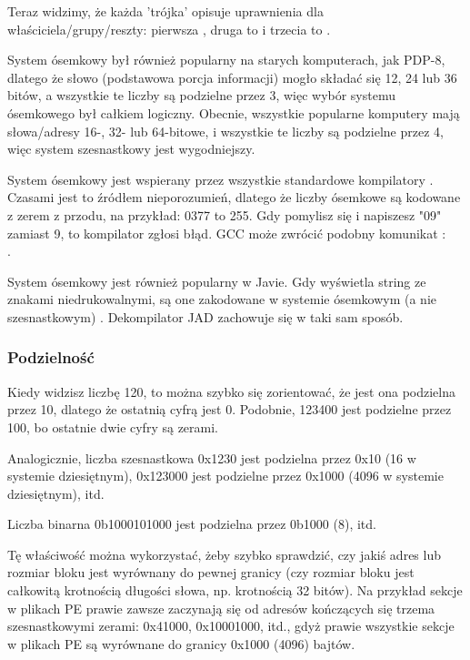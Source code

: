 Teraz widzimy, że każda 'trójka' opisuje uprawnienia dla właściciela/grupy/reszty: pierwsza , druga to  i trzecia to .

System ósemkowy był również popularny na starych komputerach, jak PDP-8, dlatego że słowo (podstawowa porcja informacji) mogło składać się 12, 24 lub
36 bitów, a wszystkie te liczby są podzielne przez 3, więc wybór systemu ósemkowego był całkiem logiczny.
Obecnie, wszystkie popularne komputery mają słowa/adresy 16-, 32- lub 64-bitowe, i wszystkie te liczby są podzielne przez 4,
więc system szesnastkowy jest wygodniejszy.

System ósemkowy jest wspierany przez wszystkie standardowe kompilatory \CCpp{}.
Czasami jest to źródłem nieporozumień, dlatego że liczby ósemkowe są kodowane z zerem z przodu, na przykład: 0377 to 255.
Gdy pomylisz się i napiszesz "09" zamiast 9, to kompilator zgłosi błąd.
GCC może zwrócić podobny komunikat :\\
.

System ósemkowy jest również popularny w Javie. Gdy \IDA wyświetla string ze znakami niedrukowalnymi, są one zakodowane w systemie ósemkowym (a nie szesnastkowym)
.
Dekompilator JAD zachowuje się w taki sam sposób.

\subsubsection{Podzielność}

Kiedy widzisz liczbę 120, to można szybko się zorientować, że jest ona podzielna przez 10, dlatego że ostatnią cyfrą jest 0.
Podobnie, 123400 jest podzielne przez 100, bo ostatnie dwie cyfry są zerami.

Analogicznie, liczba szesnastkowa 0x1230 jest podzielna przez 0x10 (16 w systemie dziesiętnym), 0x123000 jest podzielne przez 0x1000 (4096 w systemie dziesiętnym), itd.

Liczba binarna 0b1000101000 jest podzielna przez 0b1000 (8), itd.

Tę właściwość można wykorzystać, żeby szybko sprawdzić,
czy jakiś adres lub rozmiar bloku jest wyrównany do pewnej granicy (czy rozmiar bloku jest całkowitą krotnością długości słowa, np. krotnością 32 bitów).
Na przykład sekcje w plikach \ac{PE} prawie zawsze zaczynają się od adresów kończących się trzema szesnastkowymi zerami: 0x41000, 0x10001000, itd., gdyż prawie wszystkie sekcje w plikach \ac{PE} są wyrównane do granicy 0x1000 (4096) bajtów.

